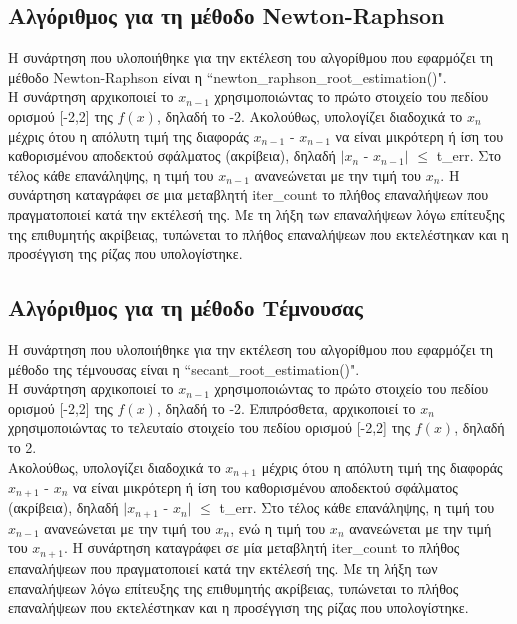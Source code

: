 \documentclass[a4paper,11pt]{article}
\newcommand{\lt}{\latintext}
\begin{document}
\subsection*{Αλγόριθμος για τη μέθοδο {\lt Newton-Raphson }}
Η συνάρτηση που υλοποιήθηκε για την εκτέλεση του αλγορίθμου που εφαρμόζει τη μέθοδο {\lt Newton-Raphson } είναι η {\lt ``newton\_raphson\_root\_estimation()"}.\\
Η συνάρτηση αρχικοποιεί το {$x_{n-1}$} χρησιμοποιώντας το πρώτο στοιχείο του πεδίου ορισμού [-2,2] της {\lt $f(x)$}, δηλαδή το -2. Ακολούθως, υπολογίζει διαδοχικά το  {$x_{n}$} μέχρις ότου
η απόλυτη τιμή της διαφοράς {$x_{n-1}$} - {$x_{n-1}$} να είναι μικρότερη ή ίση του καθορισμένου αποδεκτού σφάλματος (ακρίβεια), δηλαδή $|${$x_{n}$} - {$x_{n-1}$}$|$ {$\leq$} {\lt t\_err}. Στο τέλος κάθε επανάληψης, η τιμή 		του {$x_{n-1}$} ανανεώνεται με την τιμή του {$x_{n}$}. Η συνάρτηση καταγράφει σε μια μεταβλητή {\lt iter\_count} το πλήθος επαναλήψεων που πραγματοποιεί κατά την εκτέλεσή της. Με τη λήξη των 							επαναλήψεων λόγω επίτευξης της επιθυμητής ακρίβειας, τυπώνεται το πλήθος επαναλήψεων που εκτελέστηκαν και η προσέγγιση της ρίζας που υπολογίστηκε.
\subsection*{Αλγόριθμος για τη μέθοδο Τέμνουσας}
Η συνάρτηση που υλοποιήθηκε για την εκτέλεση του αλγορίθμου που εφαρμόζει τη μέθοδο της τέμνουσας είναι η {\lt ``secant\_root\_estimation()"}. \\
Η συνάρτηση αρχικοποιεί το {$x_{n-1}$} χρησιμοποιώντας το πρώτο στοιχείο του πεδίου ορισμού [-2,2] της {\lt $f(x)$}, δηλαδή το -2. Επιπρόσθετα, αρχικοποιεί το {$x_{n}$} χρησιμοποιώντας το τελευταίο στοιχείο του 				πεδίου ορισμού [-2,2] της {\lt $f(x)$}, δηλαδή το 2.\\
Ακολούθως, υπολογίζει διαδοχικά το {$x_{n+1}$} μέχρις ότου η απόλυτη τιμή της διαφοράς {$x_{n+1}$} - {$x_{n}$} να είναι μικρότερη ή ίση του καθορισμένου αποδεκτού σφάλματος (ακρίβεια), δηλαδή 
$|${$x_{n+1}$} - {$x_{n}$}$|$ {$\leq$} {\lt t\_err}.  Στο τέλος κάθε επανάληψης, η τιμή του {$x_{n-1}$} ανανεώνεται με την τιμή του {$x_{n}$}, ενώ η τιμή του {$x_{n}$} ανανεώνεται με την τιμή του {$x_{n+1}$}. Η συνάρτηση 			καταγράφει σε μία μεταβλητή {\lt iter\_count} το πλήθος επαναλήψεων που πραγματοποιεί κατά την εκτέλεσή της. Με τη λήξη των επαναλήψεων λόγω επίτευξης της επιθυμητής ακρίβειας, τυπώνεται το πλήθος 			επαναλήψεων που εκτελέστηκαν και η προσέγγιση της ρίζας που υπολογίστηκε. 
\end{document}
